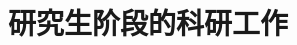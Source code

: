 \documentclass[UTF8]{ctexbeamer}	%
\theoremstyle{plain}
\theoremstyle{definition}
\theoremstyle{remark}
\numberwithin{equation}{section}
\begin{document}

\section{研究生阶段的科研工作}

\end{document}
